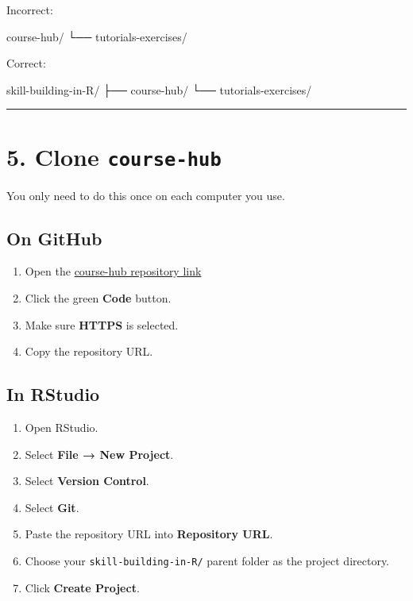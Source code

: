 \documentclass[
  letterpaper,
  DIV=11,
  numbers=noendperiod]{scrartcl}
\newenvironment{Shaded}{\begin{snugshade}}{\end{snugshade}}
\newcommand{\NormalTok}[1]{\textcolor[rgb]{0.00,0.23,0.31}{#1}}
\providecommand{\tightlist}{%
  \setlength{\itemsep}{0pt}\setlength{\parskip}{0pt}}
\begin{document}
Incorrect:

\begin{Shaded}
\begin{Highlighting}[]
\NormalTok{course{-}hub/}
\NormalTok{└── tutorials{-}exercises/}
\end{Highlighting}
\end{Shaded}

Correct:

\begin{Shaded}
\begin{Highlighting}[]
\NormalTok{skill{-}building{-}in{-}R/}
\NormalTok{├── course{-}hub/}
\NormalTok{└── tutorials{-}exercises/}
\end{Highlighting}
\end{Shaded}

\begin{center}\rule{0.5\linewidth}{0.5pt}\end{center}

\section{\texorpdfstring{5. Clone
\texttt{course-hub}}{5. Clone course-hub}}\label{clone-course-hub}

You only need to do this once on each computer you use.

\subsection{On GitHub}\label{on-github}

\begin{enumerate}
\def\labelenumi{\arabic{enumi}.}
\tightlist
\item
  Open the
  \href{https://github.com/fall2026-skill-building-in-R/course-hub}{course-hub
  repository link}
\item
  Click the green \textbf{Code} button.
\item
  Make sure \textbf{HTTPS} is selected.
\item
  Copy the repository URL.
\end{enumerate}

\subsection{In RStudio}\label{in-rstudio}

\begin{enumerate}
\def\labelenumi{\arabic{enumi}.}
\tightlist
\item
  Open RStudio.
\item
  Select \textbf{File → New Project}.
\item
  Select \textbf{Version Control}.
\item
  Select \textbf{Git}.
\item
  Paste the repository URL into \textbf{Repository URL}.
\item
  Choose your \texttt{skill-building-in-R/} parent folder as the project
  directory.
\item
  Click \textbf{Create Project}.
\end{enumerate}
\end{document}
